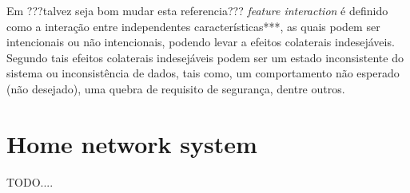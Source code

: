 Em \cite{Weiss}???talvez seja bom mudar esta referencia??? \textit{feature interaction} é definido como a interação entre independentes características***, as quais podem ser intencionais ou não intencionais, podendo levar a efeitos colaterais indesejáveis. Segundo \cite{Weiss:2007 } tais efeitos colaterais indesejáveis podem ser um estado inconsistente do sistema ou inconsistência de dados, tais como, um comportamento não esperado (não desejado), uma quebra de requisito de segurança, dentre outros.

\section{Home network system}
\label{sec:hns}
TODO....


